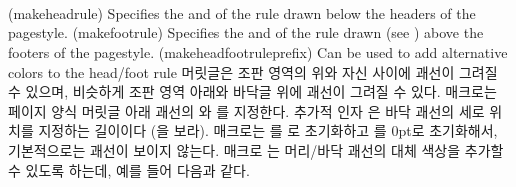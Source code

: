 \begin{syntax}
\cmd{\makeheadrule} \\
\cmd{\makefootrule} \\
\cmd{\makeheadfootruleprefix}\\
\end{syntax}
\glossary(makeheadrule)%
  {}%
  {Specifies the  and  of the rule drawn below the
   headers of the  pagestyle.}%
\glossary(makefootrule)%
  {}%
  {Specifies the  and  of the rule drawn 
   (see ) above the footers of the
   pagestyle.}%
\glossary(makeheadfootruleprefix)
{}%
{Can be used to add alternative colors to the head/foot rule}%
머릿글은 조판 영역의 위와 자신
사이에 괘선이 그려질 수 있으며, 비슷하게 조판 영역
아래와 바닥글 위에 괘선이 그려질 수 있다.
\cmd{\makeheadrule} 매크로는  페이지 양식
머릿글 아래 괘선의 와 를
지정한다.
추가적 인자 은 바닥 괘선의 세로 위치를 지정하는 길이이다
(\cmd{\footruleskip}을 보라).
\cmd{\makepagestyle} 매크로는 를 \lnc{\textwidth}로 초기화하고
를 0pt로 초기화해서, 기본적으로는 괘선이 보이지 않는다.
매크로 \cmd{\makeheadfootruleprefix}는 머리/바닥 괘선의 대체 색상을 추가할 수
있도록 하는데, 예를 들어 다음과 같다.
\begin{lcode}
\end{lcode}


